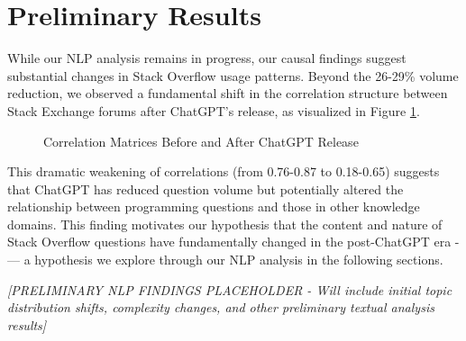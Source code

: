 \section{Preliminary Results}
While our NLP analysis remains in progress, our causal findings suggest substantial changes in Stack Overflow usage patterns. Beyond the 26-29\% volume reduction, we observed a fundamental shift in the correlation structure between Stack Exchange forums after ChatGPT's release, as visualized in Figure \ref{fig:correlation_matrix}.

\begin{figure}[htpb!]
    \centering
    
    \caption{Correlation Matrices Before and After ChatGPT Release}
    \label{fig:correlation_matrix}
\end{figure}

This dramatic weakening of correlations (from 0.76-0.87 to 0.18-0.65) suggests that ChatGPT has reduced question volume but potentially altered the relationship between programming questions and those in other knowledge domains. This finding motivates our hypothesis that the content and nature of Stack Overflow questions have fundamentally changed in the post-ChatGPT era -— a hypothesis we explore through our NLP analysis in the following sections.

\textit{[PRELIMINARY NLP FINDINGS PLACEHOLDER - Will include initial topic distribution shifts, complexity changes, and other preliminary textual analysis results]}